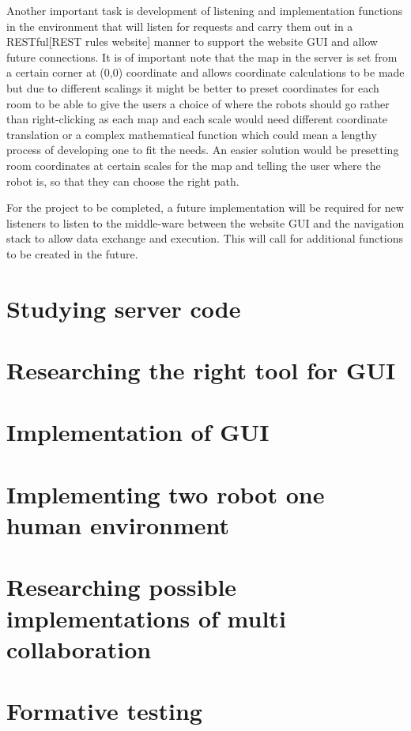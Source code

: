 \documentclass{report}
\begin{document}
    Another important task is development of listening and implementation functions in the environment that will listen for requests and carry them out in a RESTful[REST rules website] manner to support the website GUI and allow future connections. It is of important note that the map in the server is set from a certain corner at (0,0) coordinate and allows coordinate calculations to be made but due to different scalings it might be better to preset coordinates for each room to be able to give the users a choice of where the robots should go rather than right-clicking as each map and each scale would need different coordinate translation or a complex mathematical function which could mean a lengthy process of developing one to fit the needs. An easier solution would be presetting room coordinates at certain scales for the map and telling the user where the robot is, so that they can choose the right path.

    For the project to be completed, a future implementation will be required for new listeners to listen to the middle-ware between the website GUI and the navigation stack to allow data exchange and execution. This will call for additional functions to be created in the future.

  \chapter{Studying server code}
  \chapter{Researching the right tool for GUI}
  \chapter{Implementation of GUI}
  \chapter{Implementing two robot one human environment}
  \chapter{Researching possible implementations of multi collaboration}
  \chapter{Formative testing}
\end{document}

